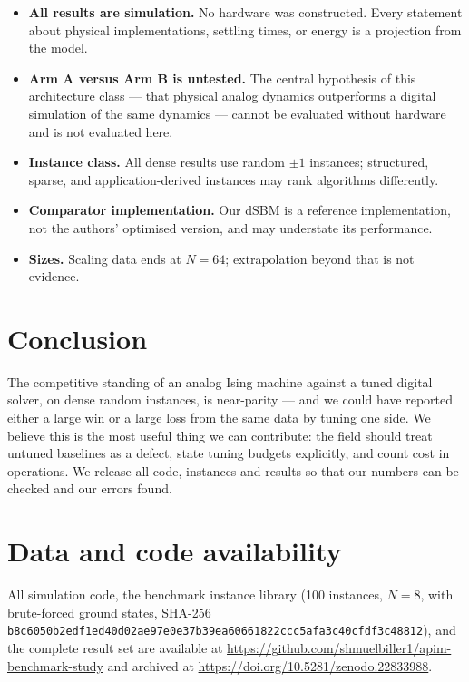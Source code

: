 \documentclass[11pt]{article}
\begin{document}
\begin{itemize}
\item \textbf{All results are simulation.} No hardware was constructed. Every
      statement about physical implementations, settling times, or energy is a
      projection from the model.
\item \textbf{Arm A versus Arm B is untested.} The central hypothesis of this
      architecture class --- that physical analog dynamics outperforms a digital
      simulation of the same dynamics --- cannot be evaluated without hardware
      and is not evaluated here.
\item \textbf{Instance class.} All dense results use random $\pm1$ instances;
      structured, sparse, and application-derived instances may rank algorithms
      differently.
\item \textbf{Comparator implementation.} Our dSBM is a reference
      implementation, not the authors' optimised version, and may understate
      its performance.
\item \textbf{Sizes.} Scaling data ends at $N=64$; extrapolation beyond that is
      not evidence.
\end{itemize}

\section{Conclusion}

The competitive standing of an analog Ising machine against a tuned digital
solver, on dense random instances, is near-parity --- and we could have reported
either a large win or a large loss from the same data by tuning one side. We
believe this is the most useful thing we can contribute: the field should treat
untuned baselines as a defect, state tuning budgets explicitly, and count cost in
operations. We release all code, instances and results so that our numbers can be
checked and our errors found.

\section*{Data and code availability}
All simulation code, the benchmark instance library (100 instances, $N=8$, with
brute-forced ground states, SHA-256
\texttt{b8c6050b2edf1ed40d02ae97e0e37b39ea60661822ccc5afa3c40cfdf3c48812}),
and the complete result set are available at
\url{https://github.com/shmuelbiller1/apim-benchmark-study} and archived at
\url{https://doi.org/10.5281/zenodo.22833988}.
\end{document}
